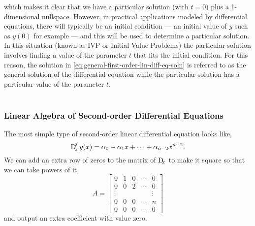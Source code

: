 \documentclass[MathsNotesBase.tex]{subfiles}
\begin{document}
{		which makes it clear that we have a particular solution (with ${ t = 0 }$) plus a 1-dimensional nullspace. However, in practical applications modeled by differential equations, there will typically be an initial condition --- an initial value of $y$ such as $y(0)$ for example --- and this will be used to determine a particular solution. In this situation (known as IVP or Initial Value Problems) the particular solution involves finding a value of the parameter $t$ that fits the initial condition. For this reason, the solution in \autoref{eq:general-first-order-lin-diff-eq-soln} is referred to as the general solution of the differential equation while the particular solution has a particular value of the parameter $t$.\\\\
		
		\bigskip
		\subsubsection{Linear Algebra of Second-order Differential Equations}
		\bigskip
		The most simple type of second-order linear differential equation looks like,
		\begin{equation}\label{eq:eq:second-order-lin-diffeq}
			 \Dif_x^2 y(x) = \alpha_0 + \alpha_1 x + \cdots + \alpha_{n-2} x^{n-2}.
		\end{equation}
		We can add an extra row of zeros to the matrix of $\Dif_x$ to make it square so that we can take powers of it,
		\[ A = \begin{bmatrix}
				0 & 1 & 0 & \cdots & 0\\
				0 & 0 & 2 & \cdots & 0\\
				\vdots &  &  &  & \vdots\\
				0 & 0 & 0 & \cdots & n \\
				0 & 0 & 0 & \cdots & 0
				\end{bmatrix}
		\]
		and output an extra coefficient with value zero.\\
		
}
\end{document}
